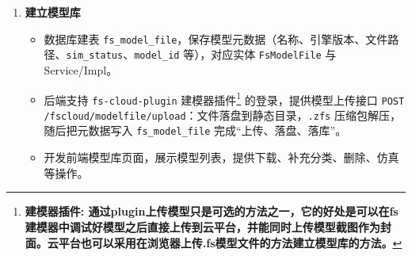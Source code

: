 \begin{enumerate}[label=\arabic*)]
	\begin{itemize}
		\item \texttt{call()}：发送 \texttt{initialize}、\texttt{tools/list} 等非工具类 JSON-RPC 方法\footnote{\bf{非工具类方法}: initialize - 校验初始化状态, tools/list - 让客户端拿到服务器支持的工具清单和参数 schema。本Demo不是AI Agent类的MCP调用，所以这两个步骤省略了。}；
		\item \texttt{callTool(toolName, args)}：构造 \texttt{tools/call} 请求，\texttt{params.name} 为工具名，\texttt{params.arguments} 为参数对象；
		\item HTTP 发送使用 \texttt{HttpURLConnection}，POST + \texttt{Content-Type: application/json} + 请求头 \texttt{X-API-Key}，建议连接超时 10s、读超时 60s；
		\item \texttt{unwrapResult()}：两层解析——先解析 MCP 响应取 \texttt{result.content[0].text}，再将该字符串解析为业务 JSON；
		\item 响应含 \texttt{error} 字段或连接异常时，抛出统一的 \texttt{McpServiceException}，由上层转为业务错误。
	\end{itemize}
	示例（启动仿真）：
	\begin{lstlisting}
// 构造 MCP tools/call 请求
JSONObject args = new JSONObject();
args.put("userId", userId);
args.put("modelId", modelId);args.put("showAnimation", showAnimation);
// callTool 内部: {jsonrpc, id, method: "tools/call",
//                params: {name: "startRemoteSimulation", arguments: args}}
return callTool("startRemoteSimulation", args);
	\end{lstlisting}\vspace{-30pt}
	\item \bf{建立模型库}\label{sec:brief-step4}
	\begin{itemize}
		\item 数据库建表 \texttt{fs\_model\_file}，保存模型元数据（名称、引擎版本、文件路径、\texttt{sim\_status}、\texttt{model\_id} 等），对应实体 \texttt{FsModelFile} 与 Service/Impl。
		\item 后端支持 \texttt{fs-cloud-plugin} 建模器插件\footnote{\bf{建模器插件}: 通过plugin上传模型只是可选的方法之一，它的好处是可以在fs建模器中调试好模型之后直接上传到云平台，并能同时上传模型截图作为封面。云平台也可以采用在浏览器上传.fs模型文件的方法建立模型库的方法。} 的登录，提供模型上传接口 \texttt{POST /fscloud/modelfile/upload}：文件落盘到静态目录，\texttt{.zfs} 压缩包解压，随后把元数据写入 \texttt{fs\_model\_file} 完成“上传、落盘、落库”。
		\item 开发前端模型库页面，展示模型列表，提供下载、补充分类、删除、仿真等操作。

\end{itemize}
\end{enumerate}
